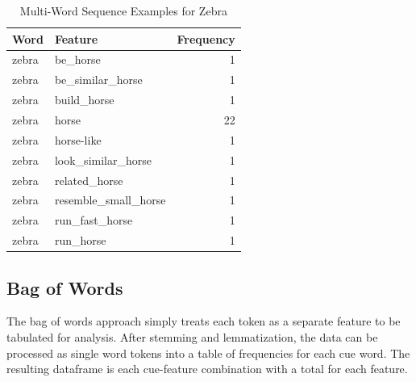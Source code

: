 \documentclass[man]{apa6}
\begin{document}
\begin{table}[t]

\caption{\label{tab:tab4}Multi-Word Sequence Examples for Zebra}
\centering
\begin{tabular}{llr}
\toprule
Word & Feature & Frequency\\
\midrule
zebra & be\_horse & 1\\
zebra & be\_similar\_horse & 1\\
zebra & build\_horse & 1\\
zebra & horse & 22\\
zebra & horse-like & 1\\
\addlinespace
zebra & look\_similar\_horse & 1\\
zebra & related\_horse & 1\\
zebra & resemble\_small\_horse & 1\\
zebra & run\_fast\_horse & 1\\
zebra & run\_horse & 1\\
\bottomrule
\end{tabular}
\end{table}

\hypertarget{bag-of-words}{%
\subsection{Bag of Words}\label{bag-of-words}}

The bag of words approach simply treats each token as a separate feature to be tabulated for analysis. After stemming and lemmatization, the data can be processed as single word tokens into a table of frequencies for each cue word. The resulting dataframe is each cue-feature combination with a total for each feature.

\scriptsize
\end{document}
